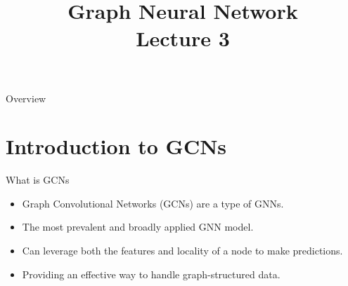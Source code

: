 \documentclass{beamer}
\title[] %
{Graph Neural Network \\Lecture 3}
\date[] %
\begin{document}
\begin{frame}
    \titlepage
\end{frame}

\begin{frame}{Overview}
    \tableofcontents
\end{frame}

\section{Introduction to GCNs}

\begin{frame}{What is GCNs}
    \begin{itemize}
        \item Graph Convolutional Networks (GCNs) are a type of GNNs.
        \item The most prevalent and broadly applied GNN model.
        \item Can leverage both the features and locality of a node to make predictions.
        \item Providing an effective way to handle graph-structured data.
      
    \end{itemize}
    
\end{frame}








%     
%     



\end{document}
